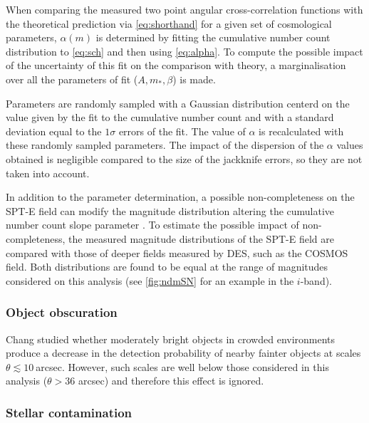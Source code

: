 	When comparing the measured two point angular cross-correlation functions with the theoretical prediction via \autoref{eq:shorthand} for a given set of cosmological parameters, $\alpha(m)$ is determined by fitting the cumulative number count distribution to \autoref{eq:sch} and then using \autoref{eq:alpha}. To compute the possible impact of the uncertainty of this fit on the comparison with theory, a marginalisation over all the parameters of fit ($A,m_*,\beta$) is made.
\newline
	
Parameters are randomly sampled with a Gaussian distribution centerd on the value given by the fit to the cumulative number count and with a standard deviation equal to the $1\sigma$ errors of the fit. The value of $\alpha$ is recalculated with these randomly sampled parameters. The impact of the dispersion of the $\alpha$ values obtained is negligible compared to the size of the jackknife errors, so they are not taken into account.
\newline

In addition to the parameter determination, a possible non-completeness on the SPT-E field can modify the magnitude distribution altering the cumulative number count slope parameter \cite{2016MNRAS.455.3943H}. To estimate the possible impact of non-completeness, the measured magnitude distributions of the SPT-E field are compared with those of deeper fields measured by DES, such as the COSMOS field. Both distributions are found to be equal at the range of magnitudes considered on this analysis (see \autoref{fig:ndmSN} for an example in the $i$-band).

\subsubsection{Object obscuration}

Chang \cite{0004-637X-801-2-73} studied whether moderately bright objects in crowded environments produce a decrease in the detection probability of nearby fainter objects at scales $\theta\lesssim10\ $arcsec. However, such scales are well below those considered in this analysis ($\theta>36$ arcsec) and therefore this effect is ignored.

\subsubsection{Stellar contamination}
    
